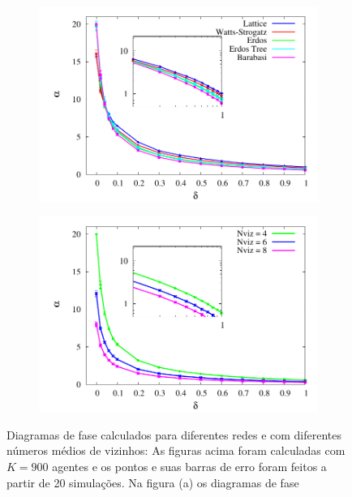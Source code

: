 \begin{figure}
    \centering
    \begin{subfigure}[]{.8\textwidth}
        \includegraphics[width=\textwidth]{Figures/Diag_AgentAgent_N400_Nviz4}
        \caption{}
        \label{fig:FaseRede}
    \end{subfigure}
    \begin{subfigure}[]{.8\textwidth}
        \includegraphics[width=\textwidth]{Figures/Diag_AgentAgent_Barabasi_N400_Dif_Nviz}
        \label{fig:FaseVis}
        \caption{}
    \end{subfigure}
    \caption{
        Diagramas de fase calculados para diferentes redes e com diferentes
        números médios de vizinhos:  As figuras acima foram calculadas com
        $K = 900$ agentes e os pontos e suas barras de erro foram feitos
        a partir de 20 simulações.  Na figura (a) os diagramas de fase
}
\end{figure}
